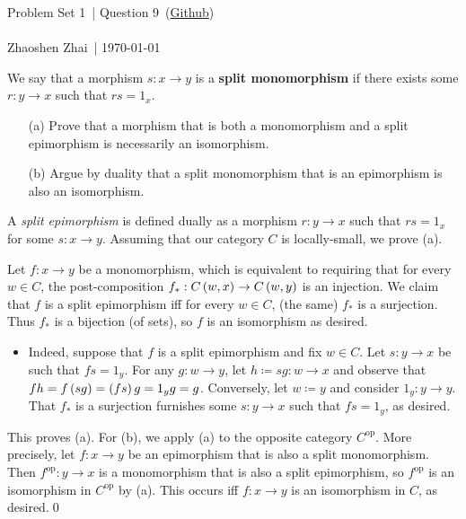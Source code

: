 \documentclass{article}
\begin{document}
    \def\problemSet{1}
    \def\question{9}
    \def\name{Zhaoshen Zhai}

    \begin{center}
        \large{Problem Set \problemSet\ | Question \question\ (\href{https://github.com/zhaoshenzhai/CatTheory-F23}{Github})}\\\ \\
        \normalsize{\name\ | \today}
    \end{center}

    \setcounter{exercise}{\question-1}

    \begin{exercise}
        We say that a morphism $s:x\to y$ is a \textbf{split monomorphism} if there exists some $r:y\to x$ such that $rs=1_x$.
        \begin{itemize}
            \item[(a)] Prove that a morphism that is both a monomorphism and a split epimorphism is necessarily an isomorphism.
            \item[(b)] Argue by duality that a split monomorphism that is an epimorphism is also an isomorphism.
        \end{itemize}
    \end{exercise}
    \begin{solution}
        A \textit{split epimorphism} is defined dually as a morphism $r:y\to x$ such that $rs=1_x$ for some $s:x\to y$. Assuming that our category $C$ is locally-small, we prove (a).
        
        Let $f:x\to y$ be a monomorphism, which is equivalent to requiring that for every $w\in C$, the post-composition $f_\ast:C\left(w,x\right)\to C\left(w,y\right)$ is an injection. We claim that $f$ is a split epimorphism iff for every $w\in C$, (the same) $f_\ast$ is a surjection. Thus $f_\ast$ is a bijection (of sets), so $f$ is an isomorphism as desired.
        \begin{itemize}
            \item Indeed, suppose that $f$ is a split epimorphism and fix $w\in C$. Let $s:y\to x$ be such that $fs=1_y$. For any $g:w\to y$, let $h\coloneqq sg:w\to x$ and observe that $fh=f\left(sg\right)=\left(fs\right)g=1_yg=g$. Conversely, let $w\coloneqq y$ and consider $1_y:y\to y$. That $f_\ast$ is a surjection furnishes some $s:y\to x$ such that $fs=1_y$, as desired.
        \end{itemize}
        This proves (a). For (b), we apply (a) to the opposite category $C^\textrm{op}$. More precisely, let $f:x\to y$ be an epimorphism that is also a split monomorphism. Then $f^\textrm{op}:y\to x$ is a monomorphism that is also a split epimorphism, so $f^\textrm{op}$ is an isomorphism in $C^\textrm{op}$ by (a). This occurs iff $f:x\to y$ is an isomorphism in $C$, as desired.\qed
    \end{solution}
\end{document}
